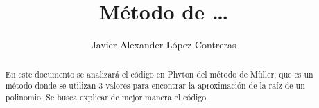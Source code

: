 \documentclass{rmf-d}
\begin{document}




\title{Método de \dots
\vspace{-6pt}}
\author{Javier Alexander López Contreras }

\address{Facultad de Ciencias Físico Matemáticas (FCFM), Universidad Autónoma de Coahuila, Campus Campo redondo }
\\

\maketitle




\begin{center}
\end{center}


\begin{abstract}
En este documento se analizará el código en Phyton del método de Müller; que es un método donde se utilizan 3 valores para encontrar la aproximación de la raíz de un polinomio. Se busca explicar de mejor manera el código.
\end{abstract}
\end{document}
